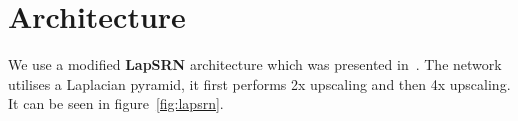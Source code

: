 \documentclass{scrartcl}
\begin{document}





\section{Architecture}
We use a modified \textbf{LapSRN} architecture which was presented in~\cite{LapSRN}.
The network utilises a Laplacian pyramid, it first performs 2x upscaling and then 4x upscaling.
It can be seen in figure~\cref{fig:lapsrn}.
\end{document}
